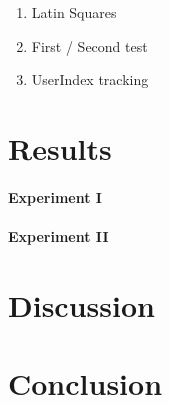 \documentclass[a4paper,11pt]{article}%
\renewcommand{\\}{\vspace*{0.5\baselineskip} \newline}
\begin{document}
\begin{enumerate}
	\item Latin Squares
	\item First / Second test
	\item UserIndex tracking
\end{enumerate}

\section{Results}

\paragraph{Experiment I}

\paragraph{Experiment II}



\section{Discussion}

\section{Conclusion}





\end{document}
